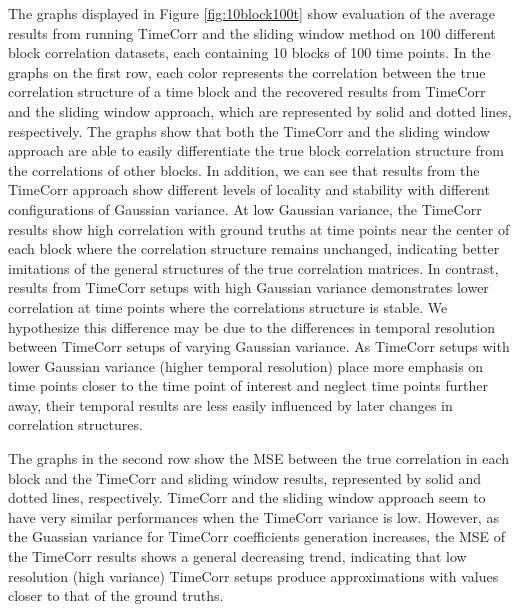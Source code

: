 \documentclass[11pt]{article}
\begin{document}
The graphs displayed in Figure \ref{fig:10block100t} show evaluation of the average results from running TimeCorr and the sliding window method on 100 different block correlation datasets, each containing 10 blocks of 100 time points. In the graphs on the first row, each color represents the correlation between the true correlation structure of a time block and the recovered results from TimeCorr and the sliding window approach, which are represented by solid and dotted lines, respectively. The graphs show that both the TimeCorr and the sliding window approach are able to easily differentiate the true block correlation structure from the correlations of other blocks. In addition, we can see that results from the TimeCorr approach show different levels of locality and stability with different configurations of Gaussian variance. At low Gaussian variance, the TimeCorr results show high correlation with ground truths at time points near the center of each block where the correlation structure remains unchanged, indicating better imitations of the general structures of the true correlation matrices. In contrast, results from TimeCorr setups with high Gaussian variance demonstrates lower correlation at time points where the correlations structure is stable. We hypothesize this difference may be due to the differences in temporal resolution between TimeCorr setups of varying Gaussian variance. As TimeCorr setups with lower Gaussian variance (higher temporal resolution) place more emphasis on time points closer to the time point of interest and neglect time points further away, their temporal results are less easily influenced by later changes in correlation structures.

The graphs in the second row show the MSE between the true correlation in each block and the TimeCorr and sliding window results, represented by solid and dotted lines, respectively. TimeCorr and the sliding window approach seem to have very similar performances when the TimeCorr variance is low. However, as the Guassian variance for TimeCorr coefficients generation increases, the MSE of the TimeCorr results shows a general decreasing trend, indicating that low resolution (high variance) TimeCorr setups produce approximations with values closer to that of the ground truths.
\end{document}
